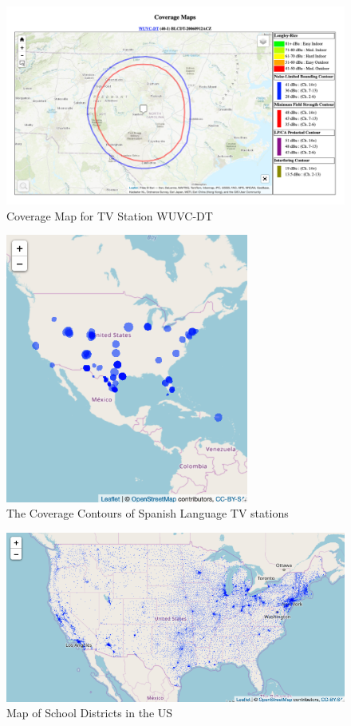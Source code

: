 \documentclass[11pt]{article}
\begin{document}
\begin{figure}[!hbtp]
\centering
\caption{Coverage Map for TV Station WUVC-DT}\label{contourexamplefig}
\includegraphics[width=15cm]{../../analysis/Output/img/ContourExample.png}
\end{figure} 

\begin{figure}[!hbtp]
\centering
\caption{The Coverage Contours of Spanish Language TV stations}\label{contourfig}
\includegraphics[width=8cm]{../../analysis/Output/img/SpanishContours.png}
\end{figure} 

\begin{figure}[!hbtp]
\centering
\caption{Map of School Districts in the US}\label{schooldistrictfig}
\includegraphics[width=12cm]{../../analysis/Output/img/LEAMap.png}
\end{figure} 
\end{document}
